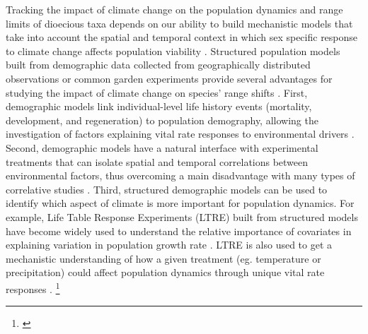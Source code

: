 \documentclass[12pt]{article}
\newcommand{\tom}[2]{{\color{red}{#1}}\footnote{\textit{\color{red}{#2}}}}
\begin{document}
Tracking the impact of climate change on the population dynamics and range limits of dioecious taxa depends on our ability to build mechanistic models that take into account the spatial and temporal context in which sex specific response to climate change affects population viability \citep{davis2001range,evans2016towards,czachura2020demographic}.
Structured population models built from demographic data collected from geographically distributed observations or common garden experiments provide several advantages for studying the impact of climate change on species' range shifts \citep{merow2017climate,schwinning2022common,schultz2022climate}.
First, demographic models link individual-level life history events (mortality, development, and regeneration) to population demography, allowing the investigation of factors explaining vital rate responses to environmental drivers \citep{ehrlen2015predicting,louthan2022climate,dahlgren2016demography}. 
Second, demographic models have a natural interface with experimental treatments that can isolate spatial and temporal correlations between environmental factors, thus overcoming a main disadvantage with many types of correlative studies \citep{leicht2007comparative}. 
Third, structured demographic models can be used to identify which aspect of climate is more important for population dynamics.
For example, Life Table Response Experiments (LTRE) built from structured models have become widely used to understand the relative importance of covariates in explaining variation in population growth rate  \citep{ellner2016data,hernandez2023exact}.
LTRE is also used to get a mechanistic understanding of how a given treatment (eg. temperature or precipitation) could affect population dynamics through unique vital rate responses \citep {caswell1989analysis,o2024nonlinear,morrison2007demographic,iler2019reproductive}. \tom{}{It is noticeable that you never mention SDMs as a point of contrast with demographic models. Are you intentionally avoiding that?}
\end{document}
